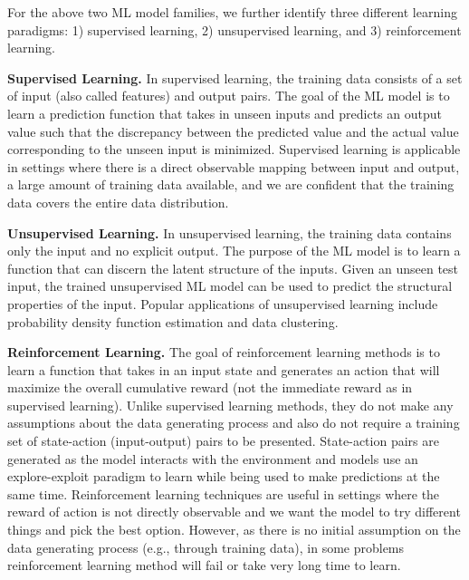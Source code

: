 For the above two ML model families, we further identify three different learning paradigms: 1) supervised learning, 2) unsupervised learning, and 3) reinforcement learning.

\vspace{2mm}
\noindent \textbf{Supervised Learning. } In supervised learning, the training data consists of a set of input (also called features) and output pairs.
The goal of the ML model is to learn a prediction function that takes in unseen inputs and predicts an output value such that the discrepancy between the predicted value and the actual value corresponding to the unseen input is minimized.
Supervised learning is applicable in settings where there is a direct observable mapping between input and output, a large amount of training data available, and we are confident that the training data covers the entire data distribution.

\vspace{2mm}
\noindent \textbf{Unsupervised Learning. } In unsupervised learning, the training data contains only the input and no explicit output.
The purpose of the ML model is to learn a function that can discern the latent structure of the inputs.
Given an unseen test input, the trained unsupervised ML model can be used to predict the structural properties of the input.
Popular applications of unsupervised learning include probability density function estimation and data clustering.

\vspace{2mm}
\noindent \textbf{Reinforcement Learning. } The goal of reinforcement learning methods is to learn a function that takes in an input state and generates an action that will maximize the overall cumulative reward (not the immediate reward as in supervised learning).
Unlike supervised learning methods, they do not make any assumptions about the data generating process and also do not require a training set of state-action (input-output) pairs to be presented.
State-action pairs are generated as the model interacts with the environment and models use an explore-exploit paradigm to learn while being used to make predictions at the same time.
Reinforcement learning techniques are useful in settings where the reward of action is not directly observable and we want the model to try different things and pick the best option.
However, as there is no initial assumption on the data generating process (e.g., through training data), in some problems reinforcement learning method will fail or take very long time to learn.